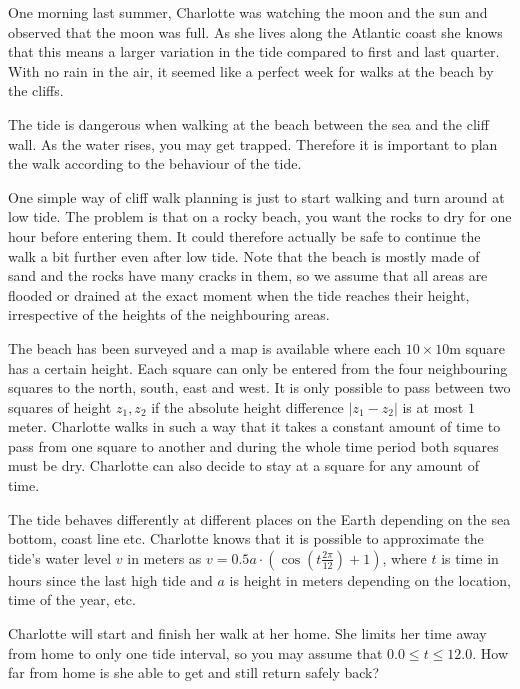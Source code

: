

One morning last summer, Charlotte was watching the moon and the sun and observed that the moon was
full. As she lives along the Atlantic coast she knows that this means a larger variation in the
tide compared to first and last quarter. With no rain in the air, it seemed like a perfect week for
walks at the beach by the cliffs.

The tide is dangerous when walking at the beach between the sea and the cliff wall. As the water
rises, you may get trapped. Therefore it is important to plan the walk according to the behaviour of the tide.

One simple way of cliff walk planning is just to start walking and turn around at low tide. The
problem is that on a rocky beach, you want the rocks to dry for one hour before entering them. It
could therefore actually be safe to continue the walk a bit further even after low tide. Note that
the beach is mostly made of sand and the rocks have many cracks in them, so we assume that all areas
are flooded or drained at the exact moment when the tide reaches their height,
irrespective of the heights of the neighbouring areas.

The beach has been surveyed and a map is available where each $10\times 10$m square has a certain height. Each
square can only be entered from the four neighbouring squares to the north, south, east and west. It
is only possible to pass between two squares of height $z_1, z_2$ if the absolute height difference
$|z_1 - z_2|$ is at most $1$ meter. Charlotte walks in such a way that it takes a constant amount of time to pass from
one square to another and during the whole time period both squares must be dry.
Charlotte can also decide to stay at a square for any amount of time.

The tide behaves differently at different places on the Earth depending on the sea bottom, coast
line etc. Charlotte knows that it is possible to approximate the tide's water level $v$ in meters as
$v = 0.5a\cdot(\cos(t\frac{2\pi}{12})+1)$, where $t$ is time in hours since the last high tide and
$a$ is height in meters depending on the location, time of the year, etc.

Charlotte will start and finish her walk at her home. She limits her time away from home to only one
tide interval, so you may assume that $0.0 \leq t \leq 12.0$. How far from home is she able to get
and still return safely back?


